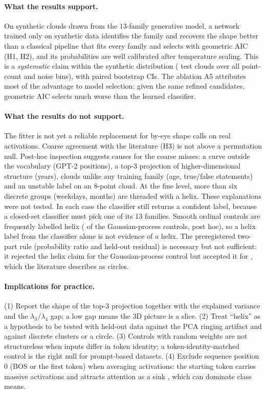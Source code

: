 
\paragraph{What the results support.} On synthetic clouds drawn from the 13-family generative model, a network trained only on synthetic data identifies the family and recovers the shape better than a classical pipeline that fits every family and selects with geometric AIC (H1, H2), and its probabilities are well calibrated after temperature scaling. This is a \emph{systematic} claim within the synthetic distribution (\nMethod{} test clouds over all point-count and noise bins), with paired bootstrap CIs. The ablation A5 attributes most of the advantage to model selection: given the same refined candidates, geometric AIC selects much worse than the learned classifier.

\paragraph{What the results do not support.} The fitter is not yet a reliable replacement for by-eye shape calls on real activations. Coarse agreement with the literature (H3) is not above a permutation null. Post-hoc inspection suggests causes for the coarse misses: a curve outside the vocabulary (GPT-2 positions), a top-3 projection of higher-dimensional structure (years), clouds unlike any training family (age, true/false statements) and an unstable label on an 8-point cloud. At the fine level, more than six discrete groups (weekdays, months) are threaded with a helix. These explanations were not tested. In each case the classifier still returns a confident label, because a closed-set classifier must pick one of its 13 families. Smooth ordinal controls are frequently labelled helix (\hfourGpHelix{} of the Gaussian-process controls, post hoc), so a helix label from the classifier alone is not evidence of a helix. The preregistered two-part rule (probability ratio and held-out residual) is necessary but not sufficient: it rejected the helix claim for the Gaussian-process control but accepted it for \helixRuleAccepted{}, which the literature describes as circles.

\paragraph{Implications for practice.} (1) Report the shape of the top-3 projection together with the explained variance and the $\lambda_3/\lambda_4$ gap; a low gap means the 3D picture is a slice. (2) Treat ``helix'' as a hypothesis to be tested with held-out data against the PCA ringing artifact \citep{novembre2008horseshoe,antognini2018walks,shinn2023phantom} and against discrete clusters or a circle. (3) Controls with random weights are not structureless when inputs differ in token identity; a token-identity-matched control is the right null for prompt-based datasets. (4) Exclude sequence position 0 (BOS or the first token) when averaging activations: the starting token carries massive activations and attracts attention as a sink \citep{sun2024massive,xiao2024sinks}, which can dominate class means.

